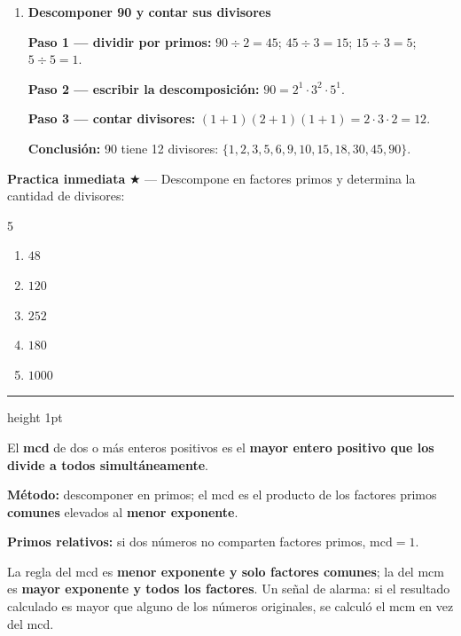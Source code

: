 \documentclass[11pt, letterpaper]{article}
\newcommand{\subbloque}[1]{%
  \vspace{14pt}
  \noindent{\large\bfseries\color{zenitnavy} #1}\par
  \vspace{4pt}\hrule height 1pt\vspace{8pt}}
\begin{document}
\begin{tcolorbox}[examplebox, title={Ejemplo --- descomposici\'on prima y conteo de divisores}]
\begin{enumerate}[label=\textbf{Ej. \arabic*.}, leftmargin=*, itemsep=12pt]

\item \textbf{Descomponer 90 y contar sus divisores}

\textbf{Paso 1 --- dividir por primos:} $90\div 2=45$; $45\div 3=15$; $15\div 3=5$; $5\div 5=1$.

\textbf{Paso 2 --- escribir la descomposici\'on:} $90=2^1\cdot 3^2\cdot 5^1$.

\textbf{Paso 3 --- contar divisores:} $(1+1)(2+1)(1+1)=2\cdot 3\cdot 2=12$.

\textbf{Conclusi\'on:} 90 tiene 12 divisores: $\{1,2,3,5,6,9,10,15,18,30,45,90\}$.

\end{enumerate}
\end{tcolorbox}

\medskip
\textbf{Practica inmediata} \quad $\bigstar$ --- Descompone en factores primos y determina la cantidad de divisores:
\begin{multicols}{5}
\begin{enumerate}[label=\alph*), leftmargin=*]
  \item $48$
  \item $120$
  \item $252$
  \item $180$
  \item $1000$
\end{enumerate}
\end{multicols}

\subbloque{4.3 M\'aximo com\'un divisor (mcd)}
\label{sub:4.3}

\begin{tcolorbox}[importantbox, title={M\'aximo com\'un divisor}]
El \textbf{mcd} de dos o m\'as enteros positivos es el \textbf{mayor entero positivo que los divide a todos simult\'aneamente}.

\textbf{M\'etodo:} descomponer en primos; el mcd es el producto de los factores primos \textbf{comunes} elevados al \textbf{menor exponente}.

\textbf{Primos relativos:} si dos n\'umeros no comparten factores primos, $\text{mcd}=1$.
\end{tcolorbox}

\begin{tcolorbox}[warningbox, title={Error frecuente --- confundir mcd con mcm}]
La regla del mcd es \textbf{menor exponente y solo factores comunes}; la del mcm es \textbf{mayor exponente y todos los factores}. Un se\~nal de alarma: si el resultado calculado es mayor que alguno de los n\'umeros originales, se calcul\'o el mcm en vez del mcd.
\end{tcolorbox}
\end{document}

